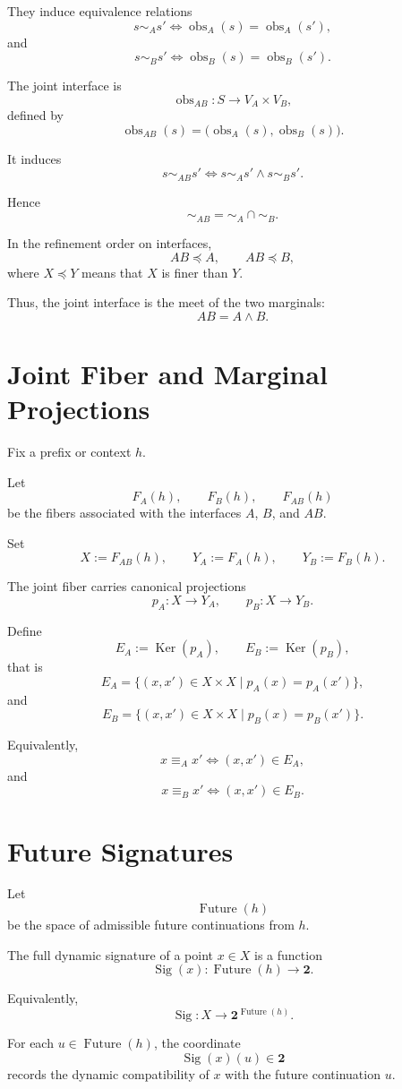 \documentclass[11pt]{article}
\newcommand{\Obs}{\operatorname{obs}}
\newcommand{\Future}{\operatorname{Future}}
\newcommand{\Sig}{\operatorname{Sig}}
\newcommand{\Ker}{\operatorname{Ker}}
\newcommand{\two}{\mathbf{2}}
\begin{document}
They induce equivalence relations
\[
s\sim_A s'
\iff
\Obs_A(s)=\Obs_A(s'),
\]
and
\[
s\sim_B s'
\iff
\Obs_B(s)=\Obs_B(s').
\]

The joint interface is
\[
\Obs_{AB}:S\to V_A\times V_B,
\]
defined by
\[
\Obs_{AB}(s)=\bigl(\Obs_A(s),\Obs_B(s)\bigr).
\]

It induces
\[
s\sim_{AB}s'
\iff
s\sim_A s'\wedge s\sim_B s'.
\]

Hence
\[
\sim_{AB}=\sim_A\cap\sim_B.
\]

In the refinement order on interfaces,
\[
AB\preceq A,
\qquad
AB\preceq B,
\]
where \(X\preceq Y\) means that \(X\) is finer than \(Y\).

Thus, the joint interface is the meet of the two marginals:
\[
AB=A\wedge B.
\]

\section{Joint Fiber and Marginal Projections}

Fix a prefix or context \(h\).

Let
\[
F_A(h),
\qquad
F_B(h),
\qquad
F_{AB}(h)
\]
be the fibers associated with the interfaces \(A\), \(B\), and \(AB\).

Set
\[
X:=F_{AB}(h),
\qquad
Y_A:=F_A(h),
\qquad
Y_B:=F_B(h).
\]

The joint fiber carries canonical projections
\[
p_A:X\to Y_A,
\qquad
p_B:X\to Y_B.
\]

Define
\[
E_A:=\Ker(p_A),
\qquad
E_B:=\Ker(p_B),
\]
that is
\[
E_A=\{(x,x')\in X\times X\mid p_A(x)=p_A(x')\},
\]
and
\[
E_B=\{(x,x')\in X\times X\mid p_B(x)=p_B(x')\}.
\]

Equivalently,
\[
x\equiv_A x'
\iff
(x,x')\in E_A,
\]
and
\[
x\equiv_B x'
\iff
(x,x')\in E_B.
\]

\section{Future Signatures}

Let
\[
\Future(h)
\]
be the space of admissible future continuations from \(h\).

The full dynamic signature of a point \(x\in X\) is a function
\[
\Sig(x):\Future(h)\to\two.
\]

Equivalently,
\[
\Sig:X\to \two^{\Future(h)}.
\]

For each \(u\in\Future(h)\), the coordinate
\[
\Sig(x)(u)\in\two
\]
records the dynamic compatibility of \(x\) with the future continuation \(u\).
\end{document}
